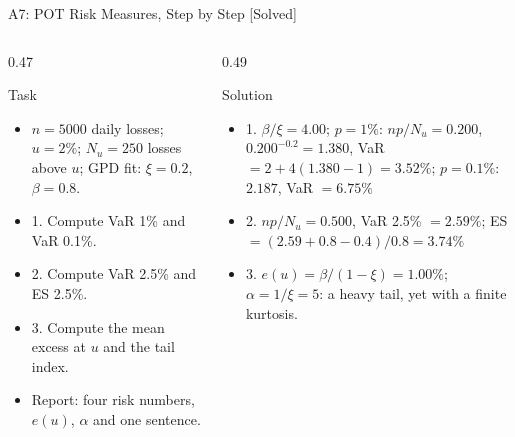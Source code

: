 \begin{frame}{A7: POT Risk Measures, Step by Step [Solved]}
\itemsize{\scriptsize}
\begin{columns}[T]
\begin{column}{0.47\textwidth}
\begin{block}{Task}
\begin{itemize}
    \item $n = 5000$ daily losses; $u = 2\%$; $N_u = 250$ losses above $u$; GPD fit: $\xi = 0.2$, $\beta = 0.8$.
    \item 1. Compute VaR 1\% and VaR 0.1\%.
    \item 2. Compute VaR 2.5\% and ES 2.5\%.
    \item 3. Compute the mean excess at $u$ and the tail index.
    \item Report: four risk numbers, $e(u)$, $\alpha$ and one sentence.
\end{itemize}
\end{block}
\end{column}
\begin{column}{0.49\textwidth}
\begin{exampleblock}{Solution}
\begin{itemize}
    \item 1. $\beta/\xi = 4.00$; $p = 1\%$: $np/N_u = 0.200$, $0.200^{-0.2} = 1.380$, VaR $= 2 + 4(1.380 - 1) = 3.52\%$; $p = 0.1\%$: $2.187$, VaR $= 6.75\%$
    \item 2. $np/N_u = 0.500$, VaR 2.5\% $= 2.59\%$; ES $= (2.59 + 0.8 - 0.4)/0.8 = 3.74\%$
    \item 3. $e(u) = \beta/(1 - \xi) = 1.00\%$; $\alpha = 1/\xi = 5$: a heavy tail, yet with a finite kurtosis.
\end{itemize}
\end{exampleblock}
\end{column}
\end{columns}
\end{frame}

